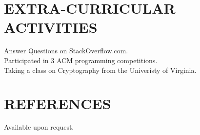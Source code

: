\documentclass[line]{res}
\begin{document}
\begin{resume}
\section{EXTRA-CURRICULAR ACTIVITIES}
	Answer Questions on StackOverflow.com.\\
	Participated in 3 ACM programming competitions.\\
	Taking a class on Cryptography from the Univeristy of Virginia.\\

\section{REFERENCES} Available upon request.
\end{resume}
\end{document}
